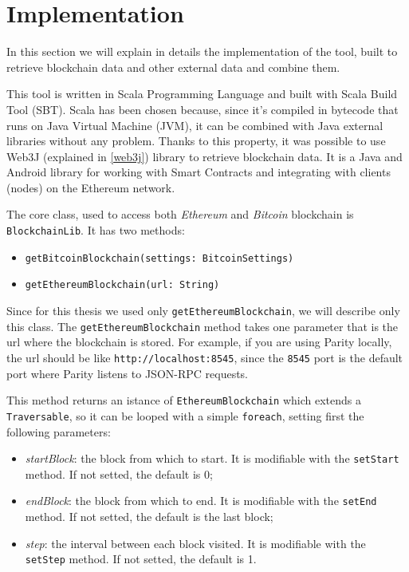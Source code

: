\section{Implementation}
In this section we will explain in details the implementation of the tool, built to retrieve blockchain data and other external data and combine them.

This tool is written in Scala Programming Language and built with Scala Build Tool (SBT). Scala has been chosen because, since it's compiled in bytecode that runs on Java Virtual Machine (JVM), it can be combined with Java external libraries without any problem. \newline
Thanks to this property, it was possible to use Web3J (explained in \ref{web3j}) library to retrieve blockchain data. It is a Java and Android library for working with Smart Contracts and integrating with clients (nodes) on the Ethereum network.

The core class, used to access both \textit{Ethereum} and \textit{Bitcoin} blockchain is \texttt{BlockchainLib}. It has two methods:
\begin{itemize}
    \item \texttt{getBitcoinBlockchain(settings: BitcoinSettings)}
    \item \texttt{getEthereumBlockchain(url: String)}
\end{itemize}
Since for this thesis we used only \texttt{getEthereumBlockchain}, we will describe only this class. 
\newline
The \texttt{getEthereumBlockchain} method takes one parameter that is the url where the blockchain is stored.
For example, if you are using Parity locally, the url should be like \texttt{http://localhost:8545}, since the \texttt{8545} port is the default port where Parity listens to JSON-RPC requests.

This method returns an istance of \texttt{EthereumBlockchain} which extends a \texttt{Traversable}, so it can be looped with a simple \texttt{foreach}, setting first the following parameters:
\begin{itemize}
    \item \textit{startBlock}: the block from which to start. It is modifiable with the \texttt{setStart} method. If not setted, the default is 0;
    \item \textit{endBlock}: the block from which to end. It is modifiable with the \texttt{setEnd} method. If not setted, the default is the last block;
    \item \textit{step}: the interval between each block visited. It is modifiable with the \texttt{setStep} method. If not setted, the default is 1.
\end{itemize}

